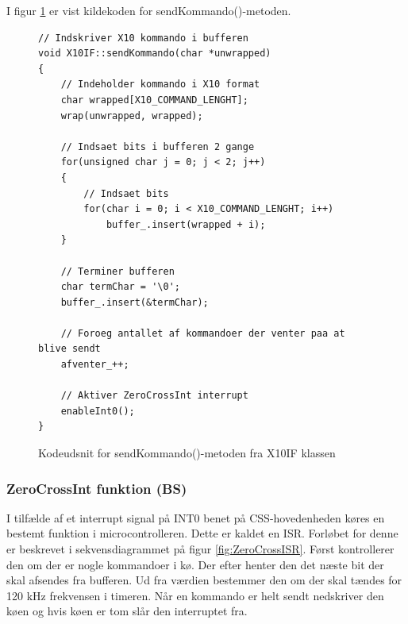 I figur \ref{list:X10_sendkommando_source} er vist kildekoden for sendKommando()-metoden.

\begin{figure}[!htb]
\lstset{language=C++}
\begin{lstlisting}
// Indskriver X10 kommando i bufferen
void X10IF::sendKommando(char *unwrapped)
{
	// Indeholder kommando i X10 format
	char wrapped[X10_COMMAND_LENGHT];
	wrap(unwrapped, wrapped);
	
	// Indsaet bits i bufferen 2 gange
	for(unsigned char j = 0; j < 2; j++)
	{
		// Indsaet bits
		for(char i = 0; i < X10_COMMAND_LENGHT; i++)
			buffer_.insert(wrapped + i);
	}
	
	// Terminer bufferen
	char termChar = '\0';
	buffer_.insert(&termChar);
	
	// Foroeg antallet af kommandoer der venter paa at blive sendt
	afventer_++;
	
	// Aktiver ZeroCrossInt interrupt
	enableInt0();
}
\end{lstlisting}
\caption{Kodeudsnit for sendKommando()-metoden fra X10IF klassen}
\label{list:X10_sendkommando_source}
\end{figure}


\subsubsection{ZeroCrossInt funktion (BS)}
I tilfælde af et interrupt signal på INT0 benet på CSS-hovedenheden køres en bestemt funktion i microcontrolleren. Dette er kaldet en ISR. Forløbet for denne er beskrevet i sekvensdiagrammet på figur \ref{fig:ZeroCrossISR}.
Først kontrollerer den om der er nogle kommandoer i kø. Der efter henter den det næste bit der skal afsendes fra bufferen. Ud fra værdien bestemmer den om der skal tændes for 120 kHz frekvensen i timeren. Når en kommando er helt sendt nedskriver den køen og hvis køen er tom slår den interruptet fra.

